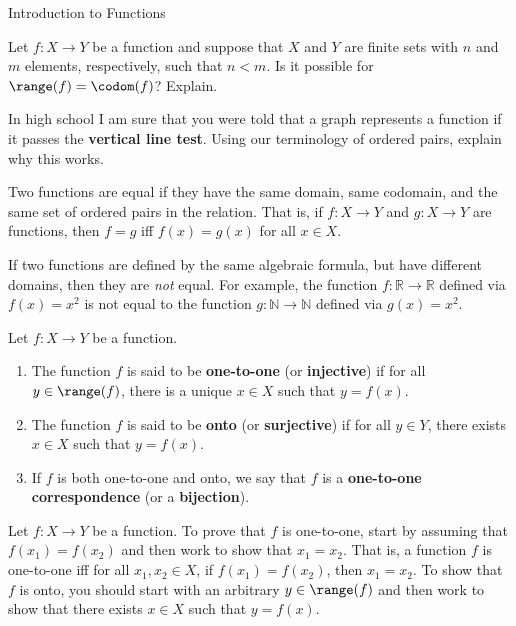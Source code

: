 \begin{section}{Introduction to Functions}
\begin{problem}
Let $f:X\to Y$ be a function and suppose that $X$ and $Y$ are finite sets with $n$ and $m$ elements, respectively, such that $n<m$.  Is it possible for $\range(f)=\codom(f)$?  Explain.
\end{problem}

\begin{problem}
In high school I am sure that you were told that a graph represents a function if it passes the \textbf{vertical line test}.  Using our terminology of ordered pairs, explain why this works.
\end{problem}

\begin{definition}
Two functions are equal if they have the same domain, same codomain, and the same set of ordered pairs in the relation. That is, if $f:X\to Y$ and $g:X\to Y$ are functions, then $f=g$ iff $f(x)=g(x)$ for all $x\in X$.
\end{definition}

If two functions are defined by the same algebraic formula, but have different domains, then they are \emph{not} equal.  For example, the function $f:\mathbb{R}\to \mathbb{R}$ defined via $f(x)=x^{2}$ is not equal to the function $g:\mathbb{N}\to\mathbb{N}$ defined via $g(x)=x^{2}$.

\begin{definition}
Let $f:X\to Y$ be a function.
\begin{enumerate}[label=\textrm{(\alph*)}]
\item The function $f$ is said to be \textbf{one-to-one} (or \textbf{injective}) if for all $y\in \range(f)$, there is a unique $x\in X$ such that $y=f(x)$.
\item The function $f$ is said to be \textbf{onto} (or \textbf{surjective}) if for all $y\in Y$, there exists $x\in X$ such that $y=f(x)$.
\item If $f$ is both one-to-one and onto, we say that $f$ is a \textbf{one-to-one correspondence} (or a \textbf{bijection}).
\end{enumerate}
\end{definition}

\begin{remark}
Let $f:X\to Y$ be a function. To prove that $f$ is one-to-one, start by assuming that $f(x_{1})=f(x_{2})$ and then work to show that $x_{1}=x_{2}$.  That is, a function $f$ is one-to-one iff for all $x_{1}, x_{2}\in X$, if $f(x_{1})=f(x_{2})$, then $x_{1}=x_{2}$. To show that $f$ is onto, you should start with an arbitrary $y\in \range(f)$ and then work to show that there exists $x\in X$ such that $y=f(x)$.
\end{remark}


\end{section}
